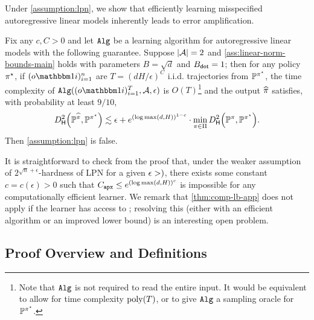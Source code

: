 Under \cref{assumption:lpn}, we show that efficiently learning misspecified autoregressive linear models inherently leads to error amplification.

\begin{theorem}\label{thm:comp-lb-app}
Fix any $c,C>0$ and let $\texttt{Alg}$ be a learning algorithm for autoregressive linear models with the following guarantee. Suppose $|\mathcal{A}|=2$ and \cref{ass:linear-norm-bounds-main} holds with parameters $B=\sqrt{d}$ and $B_{\mathsf{dot}}=1$; then for any policy $\pi^{\star}$, if $(o\ind{i})_{i=1}^n$ are $T = (dH/\epsilon)^C$ i.i.d. trajectories from $\mathbb{P}^{\pi^{\star}}$, the time complexity of $\Alg((o\ind{i})_{i=1}^T,\MA,\epsilon)$ is $O(T)$\footnote{Note that $\texttt{Alg}$ is not required to read the entire input. It would be equivalent to allow for time complexity $\mathrm{poly}(T)$, or to give $\texttt{Alg}$ a sampling oracle for $\mathbb{P}^{\pi^{\star}}$.} and the output $\widehat{\pi}$ satisfies, with probability at least $9/10$,
\[\Dhels{\BP^{\pihat}}{\BP^{\pistar}} \lesssim \epsilon + e^{(\log \max(d,H))^{1-c}} \cdot \min_{\pi \in \Pi} \Dhels{\BP^\pi}{\BP^{\pistar}}.\]
Then \cref{assumption:lpn} is false.
\end{theorem}

It is straightforward to check from the proof that, under the weaker assumption of $2^{\sqrt{n}+\epsilon}$-hardness of LPN \citep{yu2019collision,yu2021smoothing} for a given $\epsilon>)$, there exists some constant $c = c(\epsilon)>0$ such that $C_{\texttt{apx}} \leq e^{(\log \max(d,H))^c}$ is impossible for any computationally efficient learner. We remark that \cref{thm:comp-lb-app} does not apply if the learner has access to \densobs; resolving this (either with an efficient algorithm or an improved lower bound) is an interesting open problem.

\subsection{Proof Overview and Definitions}\label{subsec:comp-lb-overview}

